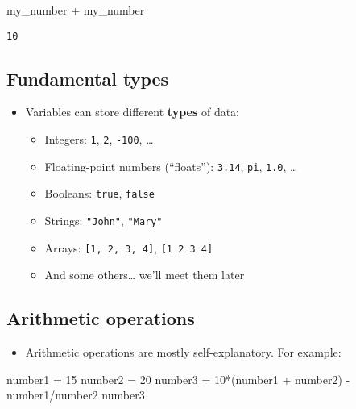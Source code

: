 \documentclass[
  letterpaper,
  DIV=11,
  numbers=noendperiod]{scrartcl}
\newenvironment{Shaded}{\begin{snugshade}}{\end{snugshade}}
\newcommand{\FloatTok}[1]{\textcolor[rgb]{0.68,0.00,0.00}{#1}}
\newcommand{\FunctionTok}[1]{\textcolor[rgb]{0.28,0.35,0.67}{#1}}
\newcommand{\NormalTok}[1]{\textcolor[rgb]{0.00,0.23,0.31}{#1}}
\newcommand{\OperatorTok}[1]{\textcolor[rgb]{0.37,0.37,0.37}{#1}}
\providecommand{\tightlist}{%
  \setlength{\itemsep}{0pt}\setlength{\parskip}{0pt}}\usepackage{longtable,booktabs,array}
\begin{document}
\begin{Shaded}
\begin{Highlighting}[]
\NormalTok{my\_number }\OperatorTok{+}\NormalTok{ my\_number}
\end{Highlighting}
\end{Shaded}

\begin{verbatim}
10
\end{verbatim}

\subsection{Fundamental types}\label{fundamental-types}

\begin{itemize}
\tightlist
\item
  Variables can store different \textbf{types} of data:

  \begin{itemize}
  \tightlist
  \item
    Integers: \texttt{1}, \texttt{2}, \texttt{-100}, \ldots{}
  \item
    Floating-point numbers (``floats''): \texttt{3.14}, \texttt{pi},
    \texttt{1.0}, \ldots{}
  \item
    Booleans: \texttt{true}, \texttt{false}
  \item
    Strings: \texttt{"John"}, \texttt{"Mary"}
  \item
    Arrays: \texttt{{[}1,\ 2,\ 3,\ 4{]}}, \texttt{{[}1\ 2\ 3\ 4{]}}
  \item
    And some others\ldots{} we'll meet them later
  \end{itemize}
\end{itemize}

\subsection{Arithmetic operations}\label{arithmetic-operations}

\begin{itemize}
\tightlist
\item
  Arithmetic operations are mostly self-explanatory. For example:
\end{itemize}

\begin{Shaded}
\begin{Highlighting}[]
\NormalTok{number1 }\OperatorTok{=} \FloatTok{15}
\NormalTok{number2 }\OperatorTok{=} \FloatTok{20}
\NormalTok{number3 }\OperatorTok{=} \FloatTok{10}\FunctionTok{*}\NormalTok{(number1 }\OperatorTok{+}\NormalTok{ number2) }\OperatorTok{{-}}\NormalTok{ number1}\OperatorTok{/}\NormalTok{number2}
\NormalTok{number3}
\end{Highlighting}
\end{Shaded}
\end{document}
